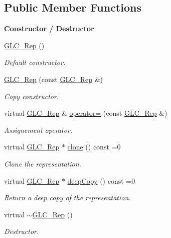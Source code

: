 \subsection*{Public Member Functions}
\begin{Indent}{\bf Constructor / Destructor}\par
\begin{DoxyCompactItemize}
\item 
\hyperlink{class_g_l_c___rep_aca04d350044316f6f97661f2b3ae8af6}{G\-L\-C\-\_\-\-Rep} ()
\begin{DoxyCompactList}\small\item\em Default constructor. \end{DoxyCompactList}\item 
\hyperlink{class_g_l_c___rep_a9429f769608063197f70faa5bc5c59c5}{G\-L\-C\-\_\-\-Rep} (const \hyperlink{class_g_l_c___rep}{G\-L\-C\-\_\-\-Rep} \&)
\begin{DoxyCompactList}\small\item\em Copy constructor. \end{DoxyCompactList}\item 
virtual \hyperlink{class_g_l_c___rep}{G\-L\-C\-\_\-\-Rep} \& \hyperlink{class_g_l_c___rep_ad2e34a2d336835fe9ce96b26632267ed}{operator=} (const \hyperlink{class_g_l_c___rep}{G\-L\-C\-\_\-\-Rep} \&)
\begin{DoxyCompactList}\small\item\em Assignement operator. \end{DoxyCompactList}\item 
virtual \hyperlink{class_g_l_c___rep}{G\-L\-C\-\_\-\-Rep} $\ast$ \hyperlink{class_g_l_c___rep_afcd061365d3568f2f663fa06cfa8f70e}{clone} () const =0
\begin{DoxyCompactList}\small\item\em Clone the representation. \end{DoxyCompactList}\item 
virtual \hyperlink{class_g_l_c___rep}{G\-L\-C\-\_\-\-Rep} $\ast$ \hyperlink{class_g_l_c___rep_ad74997ec311874e456dc008723eca56d}{deep\-Copy} () const =0
\begin{DoxyCompactList}\small\item\em Return a deep copy of the representation. \end{DoxyCompactList}\item 
virtual \hyperlink{class_g_l_c___rep_a9bd4de8d7aa73a785d5a3340a4427e14}{$\sim$\-G\-L\-C\-\_\-\-Rep} ()
\begin{DoxyCompactList}\small\item\em Destructor. \end{DoxyCompactList}\end{DoxyCompactItemize}
\end{Indent}
